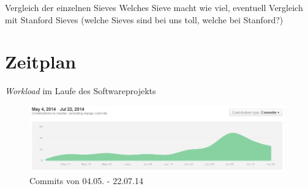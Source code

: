\documentclass[11pt,a4paper]{beamer}
\begin{document}
\begin{frame}{Vergleich der einzelnen Sieves}
Welches Sieve macht wie viel, eventuell Vergleich mit Stanford Sieves (welche Sieves sind bei uns toll, welche bei Stanford?)

\end{frame}
  

\section{Zeitplan}

\begin{frame}

    \begin{gantt}{10}{9}
    \begin{ganttitle}
    \end{ganttitle}
    \begin{ganttitle}
    \end{ganttitle}
  \end{gantt}
  
\end{frame}

\begin{frame}{\textit{Workload} im Laufe des Softwareprojekts}
\begin{figure}
\begin{center}
\includegraphics[width=11cm]{contributions_to_master.jpg}
\caption{Commits von 04.05. - 22.07.14}
\label{fig:contributions}
\end{center}
\end{figure}
\end{frame}
\end{document}
